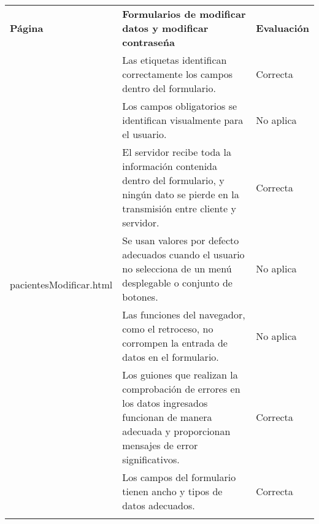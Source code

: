 \begin{table}[htpb]
\centering
\begin{tabularx}{\textwidth}{|l|X|l|}
\hline
\rowcolor[gray]{0.9}\multicolumn{3}{|l|}{\textbf{Anexo PI-006}}                                                                                                                                                                                  \\ \hline
\textbf{Página}                           & \textbf{Formularios de modificar datos y modificar contraseńa}                                                                                            & \textbf{Evaluación} \\ \hline
\multirow{10}{*}{pacientesModificar.html} & Las etiquetas identifican correctamente los campos dentro del formulario.                                                                                 & Correcta            \\ \cline{2-3} 
                                          & Los campos obligatorios se identifican visualmente para el usuario.                                                                                       & No aplica           \\ \cline{2-3} 
                                          & El servidor recibe toda la información contenida dentro del formulario, y ningún dato se pierde en la transmisión entre cliente y servidor.               & Correcta            \\ \cline{2-3} 
                                          & Se usan valores por defecto adecuados cuando el usuario no selecciona de un menú desplegable o conjunto de botones.                                       & No aplica           \\ \cline{2-3} 
                                          & Las funciones del navegador, como el retroceso, no corrompen la entrada de datos en el formulario.                                                        & No aplica           \\ \cline{2-3} 
                                          & Los guiones que realizan la comprobación de errores en los datos ingresados funcionan de manera adecuada y proporcionan mensajes de error significativos. & Correcta            \\ \cline{2-3} 
                                          & Los campos del formulario tienen ancho y tipos de datos adecuados.                                                                                        & Correcta            \\ \cline{2-3} 

\end{tabularx}
\end{table}
